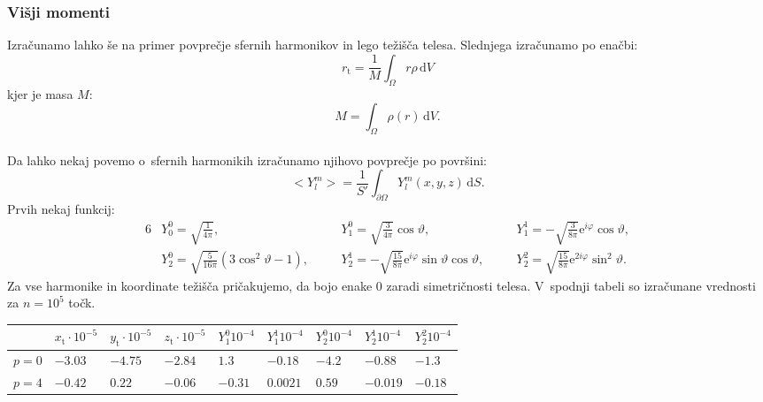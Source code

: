 \documentclass[a4paper,pdftex,10pt]{article}
\numberwithin{figure}{section} %
\begin{document}
\subsubsection{Višji momenti}
Izračunamo lahko še na primer povprečje sfernih harmonikov in lego težišča telesa.
Slednjega izračunamo po enačbi:
\begin{equation} \label{tezisce}
    r_{\mathrm{t}} = \frac{1}{M} \int_{\Omega} \!r \rho \,\text{d}V 
\end{equation}
kjer je masa $M$:
\begin{equation} \label{masa}
    M = \int_{\Omega} \!\rho(r) \,\text{d}V.
\end{equation}
\\
Da lahko nekaj povemo o~sfernih harmonikih izračunamo njihovo povprečje po površini:
\begin{equation}
    < Y_l^m > =  \frac{1}{S'} \int_{\partial \Omega} \! Y_l^m(x,y,z) \,\text{d}S.
\end{equation}
Prvih nekaj funkcij:
\begin{alignat*}{6}
    &Y_0^0 = \sqrt{\frac{1}{4\pi}}, \quad
    &&Y_1^0 = \sqrt{\frac{3}{4\pi}} \cos\vartheta,\quad
    &&Y_1^1 = -\sqrt{\frac{3}{8\pi}} \mathrm{e}^{i\varphi} \cos\vartheta, \\
    &Y_2^0 = \sqrt{\frac{5}{16\pi}}(3\cos^2\vartheta -1), \quad
    &&Y_2^1 = -\sqrt{\frac{15}{8\pi}} \mathrm{e}^{i\varphi} \sin\vartheta 
	      \cos\vartheta,\quad
    &&Y_2^2 = \sqrt{\frac{15}{8\pi}} \mathrm{e}^{2i\varphi} \sin^2\vartheta. 
\end{alignat*}
Za vse harmonike in koordinate težišča pričakujemo, da bojo enake $0$ zaradi simetričnosti
telesa. V~spodnji tabeli so izračunane vrednosti za $n=10^5$ točk.\\

\begin{tabularx}{\linewidth}{ |X|X|X|X|X|X|X|X|X| }
    \hline
    $\quad$ & $x_{\mathrm{t}} \cdot 10^{-5} $ & $y_{\mathrm{t}}\cdot 10^{-5}$ & 
    $z_{\mathrm{t}}\cdot 10^{-5}$ & 
    $Y_1^0 10^{-4}$ & $Y_1^1 10^{-4}$ & $Y_2^0 10^{-4}$ 
    & $Y_2^1 10^{-4}$ & $Y_2^2 10^{-4}$ \\ 
    \hline 
    $p=0$ & $-3.03$ & $ -4.75$ & $-2.84$ &  
    $1.3 $ & $-0.18$ & $-4.2$ & $-0.88$ & $-1.3$  \\
    \hline
    $p=4$ & $-0.42$ & $0.22$ & $-0.06$ &
    $-0.31$ &  $0.0021$ & $0.59$ & $-0.019$ & $-0.18$ \\
    \hline
\end{tabularx}
\\
\end{document}
